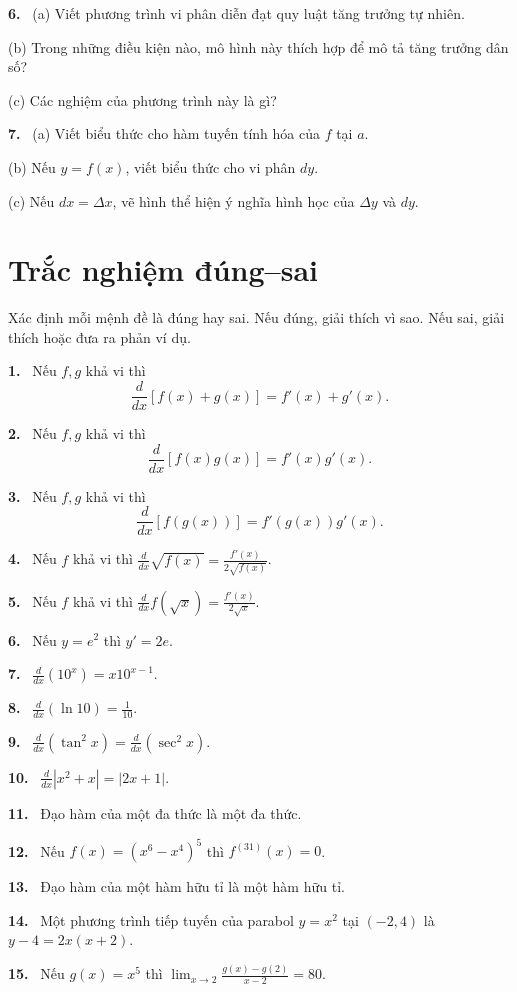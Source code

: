 \documentclass[12pt,a4paper]{article}
\newcommand{\cc}[1]{\par\medskip\noindent\textbf{#1.}\ }
\newcommand{\tf}[1]{\par\medskip\noindent\textbf{#1.}\ }
\begin{document}
\cc{6} (a) Viết phương trình vi phân diễn đạt quy luật tăng trưởng tự nhiên.

(b) Trong những điều kiện nào, mô hình này thích hợp để mô tả tăng trưởng dân số?

(c) Các nghiệm của phương trình này là gì?

\cc{7} (a) Viết biểu thức cho hàm tuyến tính hóa của $f$ tại $a$.

(b) Nếu $y=f(x)$, viết biểu thức cho vi phân $dy$.

(c) Nếu $dx=\Delta x$, vẽ hình thể hiện ý nghĩa hình học của $\Delta y$ và $dy$.

\clearpage
\section*{Trắc nghiệm đúng–sai}
Xác định mỗi mệnh đề là đúng hay sai. Nếu đúng, giải thích vì sao. Nếu sai, giải thích hoặc đưa ra phản ví dụ.

\tf{1} Nếu $f,g$ khả vi thì
\[\frac d{dx}[f(x)+g(x)]=f'(x)+g'(x).\]
\tf{2} Nếu $f,g$ khả vi thì
\[\frac d{dx}[f(x)g(x)]=f'(x)g'(x).\]
\tf{3} Nếu $f,g$ khả vi thì
\[\frac d{dx}[f(g(x))]=f'(g(x))g'(x).\]
\tf{4} Nếu $f$ khả vi thì $\displaystyle\frac d{dx}\sqrt{f(x)}=\frac{f'(x)}{2\sqrt{f(x)}}$.
\tf{5} Nếu $f$ khả vi thì $\displaystyle\frac d{dx}f(\sqrt{x})=\frac{f'(x)}{2\sqrt{x}}$.
\tf{6} Nếu $y=e^2$ thì $y'=2e$.
\tf{7} $\displaystyle\frac d{dx}(10^x)=x10^{x-1}$.
\tf{8} $\displaystyle\frac d{dx}(\ln10)=\frac1{10}$.
\tf{9} $\displaystyle\frac d{dx}(\tan^2x)=\frac d{dx}(\sec^2x)$.
\tf{10} $\displaystyle\frac d{dx}|x^2+x|=|2x+1|$.
\tf{11} Đạo hàm của một đa thức là một đa thức.
\tf{12} Nếu $f(x)=(x^6-x^4)^5$ thì $f^{(31)}(x)=0$.
\tf{13} Đạo hàm của một hàm hữu tỉ là một hàm hữu tỉ.
\tf{14} Một phương trình tiếp tuyến của parabol $y=x^2$ tại $(-2,4)$ là $y-4=2x(x+2)$.
\tf{15} Nếu $g(x)=x^5$ thì $\displaystyle\lim_{x\to2}\frac{g(x)-g(2)}{x-2}=80$.

\clearpage
\end{document}
